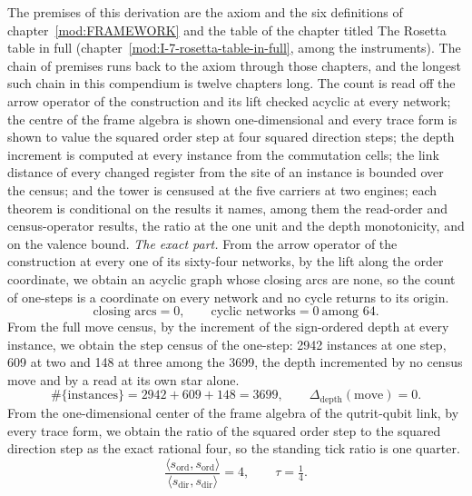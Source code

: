 \begin{chproof}
The premises of this derivation are the axiom and the six definitions of chapter~\ref{mod:FRAMEWORK} and the table of the chapter titled The Rosetta table in full (chapter~\ref{mod:I-7-rosetta-table-in-full}, among the instruments). The chain of premises runs back to the axiom through those chapters, and the longest such chain in this compendium is twelve chapters long.
The count is read off the arrow operator of the construction and its lift checked acyclic at every network; the centre of the frame algebra is shown one-dimensional and every trace form is shown to value the squared order step at four squared direction steps; the depth increment is computed at every instance from the commutation cells; the link distance of every changed register from the site of an instance is bounded over the census; and the tower is censused at the five carriers at two engines; each theorem is conditional on the results it names, among them the read-order and census-operator results, the ratio at the one unit and the depth monotonicity, and on the valence bound.
\textit{The exact part.}
From the arrow operator of the construction at every one of its sixty-four networks, by the lift along the order coordinate, we obtain an acyclic graph whose closing arcs are none, so the count of one-steps is a coordinate on every network and no cycle returns to its origin.
\begin{equation}
\text{closing arcs} = 0, \qquad \text{cyclic networks} = 0 \ \text{among } 64 .
\end{equation}
From the full move census, by the increment of the sign-ordered depth at every instance, we obtain the step census of the one-step: 2942 instances at one step, 609 at two and 148 at three among the 3699, the depth incremented by no census move and by a read at its own star alone.
\begin{equation}
\#\{\text{instances}\} = 2942 + 609 + 148 = 3699, \qquad \Delta_{\mathrm{depth}}(\text{move}) = 0 .
\end{equation}
From the one-dimensional center of the frame algebra of the qutrit-qubit link, by every trace form, we obtain the ratio of the squared order step to the squared direction step as the exact rational four, so the standing tick ratio is one quarter.
\begin{equation}
\frac{\langle s_{\mathrm{ord}}, s_{\mathrm{ord}} \rangle}{\langle s_{\mathrm{dir}}, s_{\mathrm{dir}} \rangle} = 4, \qquad \tau = \tfrac{1}{4} .
\end{equation}

\end{chproof}
